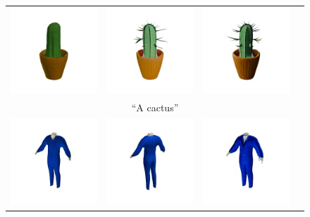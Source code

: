\begin{figure}
{\begin{tabular}{cccc}
        \includegraphics[width=0.24\linewidth, trim=50 0 50 0, clip]{images/supplementary/failure_cases/image-16_r2c1.jpg} &
        \includegraphics[width=0.24\linewidth, trim=50 0 50 0, clip]{images/supplementary/failure_cases/image-15_r1c1.jpg} &
        \includegraphics[width=0.24\linewidth, trim=50 0 50 0, clip]{images/supplementary/failure_cases/image-15_r2c1.jpg} \\
        \multicolumn{4}{c}{``A cactus''} \\
        \multicolumn{1}{c}{\includegraphics[width=0.24\linewidth, trim=50 0 50 0, clip]{images/supplementary/failure_cases/suit-shap-e-1.png}} &
        \includegraphics[width=0.24\linewidth, trim=50 0 50 0, clip]{images/supplementary/failure_cases/suit-shap-e-2.png} &
        \includegraphics[width=0.24\linewidth, trim=50 0 50 0, clip]{images/supplementary/failure_cases/suit-sharp-it-1.png} &

\end{tabular}}
\end{figure}
